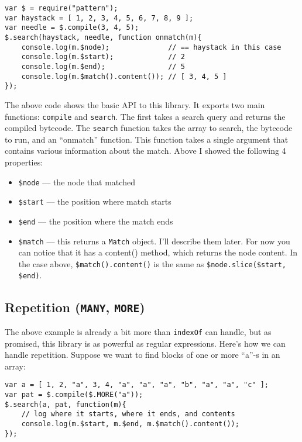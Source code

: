 \documentclass[a4paper,10pt]{article}
\begin{document}
\begin{verbatim}
var $ = require("pattern");
var haystack = [ 1, 2, 3, 4, 5, 6, 7, 8, 9 ];
var needle = $.compile(3, 4, 5);
$.search(haystack, needle, function onmatch(m){
    console.log(m.$node);              // == haystack in this case
    console.log(m.$start);             // 2
    console.log(m.$end);               // 5
    console.log(m.$match().content()); // [ 3, 4, 5 ]
});
\end{verbatim}

The above code shows the basic API to this library.  It exports two main
functions: \texttt{compile} and \texttt{search}.  The first takes a search query and
returns the compiled bytecode.  The \texttt{search} function takes the array to
search, the bytecode to run, and an “onmatch” function.  This function takes
a single argument that contains various information about the match.  Above
I showed the following 4 properties:

\begin{itemize}
\item \texttt{\$node} — the node that matched
\item \texttt{\$start} — the position where match starts
\item \texttt{\$end} — the position where the match ends
\item \texttt{\$match} — this returns a \texttt{Match} object.  I'll describe them later.  For
  now you can notice that it has a content() method, which returns the node
  content.  In the case above, \texttt{\$match().content()} is the same as
  \texttt{\$node.slice(\$start, \$end)}.
\end{itemize}
\subsection{Repetition (\texttt{MANY}, \texttt{MORE})}
\label{sec-2-1}


The above example is already a bit more than \texttt{indexOf} can handle, but as
promised, this library is as powerful as regular expressions.  Here's how we
can handle repetition.  Suppose we want to find blocks of one or more “a”-s
in an array:


\begin{verbatim}
var a = [ 1, 2, "a", 3, 4, "a", "a", "a", "b", "a", "a", "c" ];
var pat = $.compile($.MORE("a"));
$.search(a, pat, function(m){
    // log where it starts, where it ends, and contents
    console.log(m.$start, m.$end, m.$match().content());
});
\end{verbatim}
\end{document}
